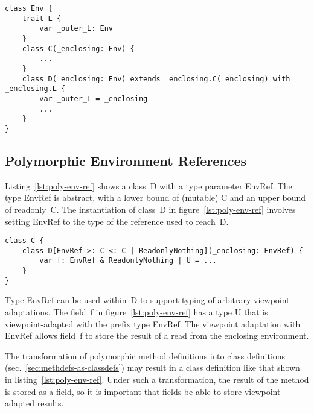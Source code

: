 \begin{lstlisting}[float=htbp, caption={Base Class and Trait with Environment References}, label={lst:base-class-trait-env-ref}]
class Env {
	trait L {
		var _outer_L: Env
	}
	class C(_enclosing: Env) {
		...
	}
	class D(_enclosing: Env) extends _enclosing.C(_enclosing) with _enclosing.L {
		var _outer_L = _enclosing
		...
	}
}
\end{lstlisting}

\subsection{Polymorphic Environment References}

%


Listing~\ref{lst:poly-env-ref} shows a class~{\cd D} with a type parameter {\cd EnvRef}. The type {\cd EnvRef} is abstract, with a lower bound of (mutable) {\cd C} and an upper bound of readonly~{\cd C}. The instantiation of class~{\cd D} in figure~\ref{lst:poly-env-ref} involves setting {\cd EnvRef} to the type of the reference used to reach~{\cd D}.

\begin{lstlisting}[float=htbp, caption={Polymorphic Environment Reference}, label={lst:poly-env-ref}]
class C {
	class D[EnvRef >: C <: C | ReadonlyNothing](_enclosing: EnvRef) {
		var f: EnvRef & ReadonlyNothing | U = ...
	}
}
\end{lstlisting}

Type {\cd EnvRef} can be used within~{\cd D} to support typing of arbitrary viewpoint adaptations. The field~{\cd f} in figure~\ref{lst:poly-env-ref} has a type {\cd U} that is viewpoint-adapted with the prefix type {\cd EnvRef}. The viewpoint adaptation with {\cd EnvRef} allows field~{\cd f} to store the result of a read from the enclosing environment.

The transformation of polymorphic method definitions into class definitions (sec.~\ref{sec:methdefs-as-classdefs}) may result in a class definition like that shown in listing~\ref{lst:poly-env-ref}. Under such a transformation, the result of the method is stored as a field, so it is important that fields be able to store viewpoint-adapted results.

